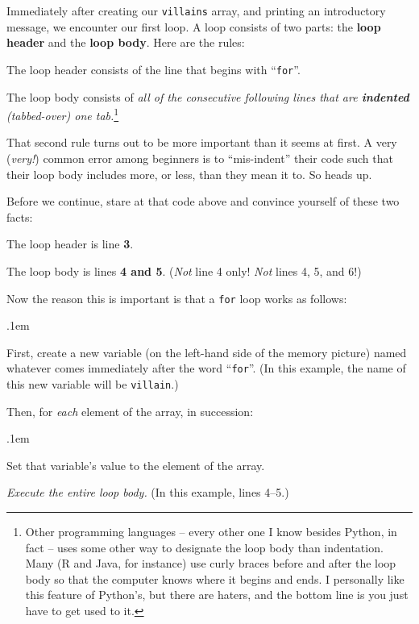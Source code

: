 Immediately after creating our \texttt{villains} array, and printing an
introductory message, we encounter our first loop. A loop consists of two
parts: the \textbf{loop header} and the \textbf{loop body}. Here are the rules:


\begin{compactitem}
\item The loop header consists of the line that begins with ``\texttt{for}''.
\item The loop body consists of \textit{all of the consecutive following lines
that are \textbf{indented} (tabbed-over) one tab.}\footnote{Other programming
languages -- every other one I know besides Python, in fact -- uses some other
way to designate the loop body than indentation. Many (R and Java, for
instance) use curly braces before and after the loop body so that the computer
knows where it begins and ends. I personally like this feature of Python's, but
there are haters, and the bottom line is you just have to get used to it.}
\end{compactitem}

That second rule turns out to be more important than it seems at first. A very
(\textit{very!}) common error among beginners is to ``mis-indent'' their code
such that their loop body includes more, or less, than they mean it to. So
heads up.

Before we continue, stare at that code above and convince yourself of these two
facts:

\begin{compactitem}
\item[\leftpointright] The loop header is line \textbf{3}.
\item[\leftpointright] The loop body is lines \textbf{4 and 5}. (\textit{Not} line 4
only! \textit{Not} lines 4, 5, and 6!)
\end{compactitem}

Now the reason this is important is that a \texttt{for} loop works as follows:


\begin{compactenum}
\itemsep.1em
\item First, create a new variable (on the left-hand side of the memory
picture) named whatever comes immediately after the word ``\texttt{for}''. (In
this example, the name of this new variable will be \texttt{villain}.)
\item Then, for \textit{each} element of the array, in succession:
    \begin{compactenum}
    \itemsep.1em
    \item Set that variable's value to the element of the array.
    \item \textit{Execute the entire loop body.} (In this example, lines 4--5.)
    \end{compactenum}
\end{compactenum}

